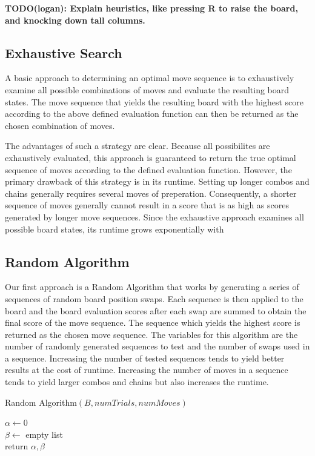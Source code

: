 \documentclass[12pt]{IEEEtran}
\begin{document}
\textbf{TODO(logan): Explain heuristics, like pressing R to raise the board, and knocking down tall columns.}

\subsection{Exhaustive Search}
A basic approach to determining an optimal move sequence is to exhaustively examine all possible combinations of moves and evaluate the resulting board states. The move sequence that yields the resulting board with the highest score according to the above defined evaluation function can then be returned as the chosen combination of moves.

The advantages of such a strategy are clear. Because all possibilites are exhaustively evaluated, this approach is guaranteed to return the true optimal sequence of moves according to the defined evaluation function. However, the primary drawback of this strategy is in its runtime. Setting up longer combos and chains generally requires several moves of preperation. Consequently, a shorter sequence of moves generally cannot result in a score that is as high as scores generated by longer move sequences. Since the exhaustive approach examines all possible board states, its runtime grows exponentially with

\subsection{Random Algorithm}

Our first approach is a Random Algorithm that works by generating a series of sequences of random board position swaps. Each sequence is then applied to the board and the board evaluation scores after each swap are summed to obtain the final score of the move sequence. The sequence which yields the highest score is returned as the chosen move sequence. The variables for this algorithm are the number of randomly generated sequences to test and the number of swaps used in a sequence. Increasing the number of tested sequences tends to yield better results at the cost of runtime. Increasing the number of moves in a sequence tends to yield larger combos and chains but also increases the runtime.
\begin{algorithm}\label{random}\small
\caption{\small Random Algorithm$(B, numTrials, numMoves)$}
$\alpha \gets 0$ \\
$\beta \gets $ empty list\\
return $\alpha, \beta$
\end{algorithm}
\end{document}
